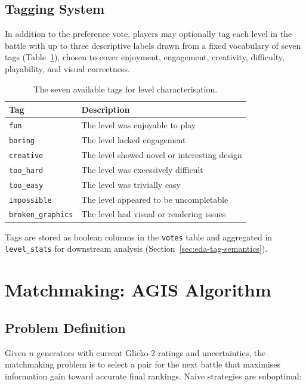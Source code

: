 \documentclass[shortabstract, mgr, english]{iithesis}
\begin{document}
\subsection{Tagging System}
\label{subsec:sd-tagging}

In addition to the preference vote, players may optionally tag each level in the battle
with up to three descriptive labels drawn from a fixed vocabulary of seven tags
(Table~\ref{tab:tags}), chosen to cover enjoyment, engagement, creativity, difficulty,
playability, and visual correctness.

\begin{table}[H]
\centering
\begin{tabular}{ll}
\toprule
\textbf{Tag} & \textbf{Description} \\
\midrule
\texttt{fun}              & The level was enjoyable to play \\
\texttt{boring}           & The level lacked engagement \\
\texttt{creative}         & The level showed novel or interesting design \\
\texttt{too\_hard}        & The level was excessively difficult \\
\texttt{too\_easy}        & The level was trivially easy \\
\texttt{impossible}       & The level appeared to be uncompletable \\
\texttt{broken\_graphics} & The level had visual or rendering issues \\
\bottomrule
\end{tabular}
\caption{The seven available tags for level characterisation.}
\label{tab:tags}
\end{table}

Tags are stored as boolean columns in the \texttt{votes} table and aggregated in
\texttt{level\_stats} for downstream analysis (Section~\ref{sec:eda-tag-semantics}).

\section{Matchmaking: AGIS Algorithm}
\label{sec:sd-matchmaking}

\subsection{Problem Definition}
\label{subsec:sd-matchmaking-problem}

Given $n$ generators with current Glicko-2 ratings and uncertainties, the matchmaking
problem is to select a pair for the next battle that maximises information gain toward
accurate final rankings. Naive strategies are suboptimal:
\end{document}
